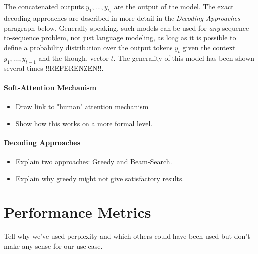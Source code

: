 The concatenated outputs $y_1,...,y_{t_2}$ are the output of the model. The exact decoding approaches are described in more detail in the \emph{Decoding Approaches} paragraph below. Generally speaking, such models can be used for \emph{any} sequence-to-sequence problem, not just language modeling, as long as it is possible to define a probability distribution over the output tokens $y_t$ given the context $y_1,\dots,y_{t-1}$ and the thought vector $t$. The generality of this model has been shown several times !!REFERENZEN!!.

\paragraph{Soft-Attention Mechanism}
\begin{itemize}
\item Draw link to "human" attention mechanism
\item Show how this works on a more formal level.
\end{itemize}

\paragraph{Decoding Approaches}
\begin{itemize}
	\item Explain two approaches: Greedy and Beam-Search.
	\item Explain why greedy might not give satisfactory results.
\end{itemize}

\section{Performance Metrics}
Tell why we've used perplexity and which others could have been used but don't make any sense for our use case.
